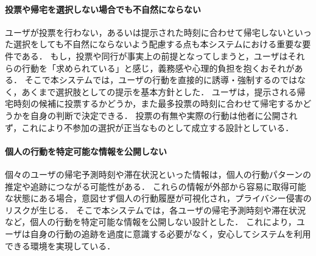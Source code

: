 \paragraph{投票や帰宅を選択しない場合でも不自然にならない}
ユーザが投票を行わない，あるいは提示された時刻に合わせて帰宅しないといった選択をしても不自然にならないよう配慮する点も本システムにおける重要な要件である．
もし，投票や同行が事実上の前提となってしまうと，ユーザはそれらの行動を「求められている」と感じ，義務感や心理的負担を抱くおそれがある．
そこで本システムでは，ユーザの行動を直接的に誘導・強制するのではなく，あくまで選択肢としての提示を基本方針とした．
ユーザは，提示される帰宅時刻の候補に投票するかどうか，また最多投票の時刻に合わせて帰宅するかどうかを自身の判断で決定できる．
投票の有無や実際の行動は他者に公開されず，これにより不参加の選択が正当なものとして成立する設計としている．


\paragraph{個人の行動を特定可能な情報を公開しない}
個々のユーザの帰宅予測時刻や滞在状況といった情報は，個人の行動パターンの推定や追跡につながる可能性がある．
これらの情報が外部から容易に取得可能な状態にある場合，意図せず個人の行動履歴が可視化され，プライバシー侵害のリスクが生じる．
そこで本システムでは，各ユーザの帰宅予測時刻や滞在状況など，個人の行動を特定可能な情報を公開しない設計とした．
これにより，ユーザは自身の行動の追跡を過度に意識する必要がなく，安心してシステムを利用できる環境を実現している．


